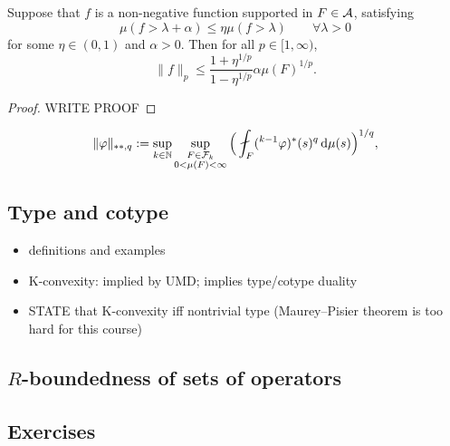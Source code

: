\begin{lem}
  Suppose that $f$ is a non-negative function supported in $F \in \mathcal{A}$, satisfying
  \begin{equation*}
    \mu(f > \lambda + \alpha) \leq \eta \mu(f > \lambda) \qquad \forall \lambda > 0
  \end{equation*}
  for some $\eta \in (0,1)$ and $\alpha > 0$.
  Then for all $p \in [1,\infty)$,
  \begin{equation*}
    \|f\|_p \leq \frac{1 + \eta^{1/p}}{1 - \eta^{1/p}} \alpha \mu(F)^{1/p}.
  \end{equation*}
\end{lem}

\begin{proof}
  {\color{red} WRITE PROOF}
\end{proof}


{\color{blue}

\begin{equation*}
  \|\phi\|_{**,q} := \sup_{k \in \N} \sup_{\substack{F \in \mc{F}_k \\ 0 < \mu(F) < \infty}} \Big( \fint_{F} ({}^{k-1} \phi)^{*}(s)^q \, \dd\mu(s) \Big)^{1/q},
\end{equation*}

}




\subsection{Type and cotype}

\begin{itemize}
\item definitions and examples
\item K-convexity: implied by UMD; implies type/cotype duality
\item STATE that K-convexity iff nontrivial type (Maurey--Pisier theorem is too hard for this course)
\end{itemize}

\subsection{\texorpdfstring{$R$-boundedness of sets of operators}{R-boundedness of sets of operators}}

\subsection*{Exercises}

